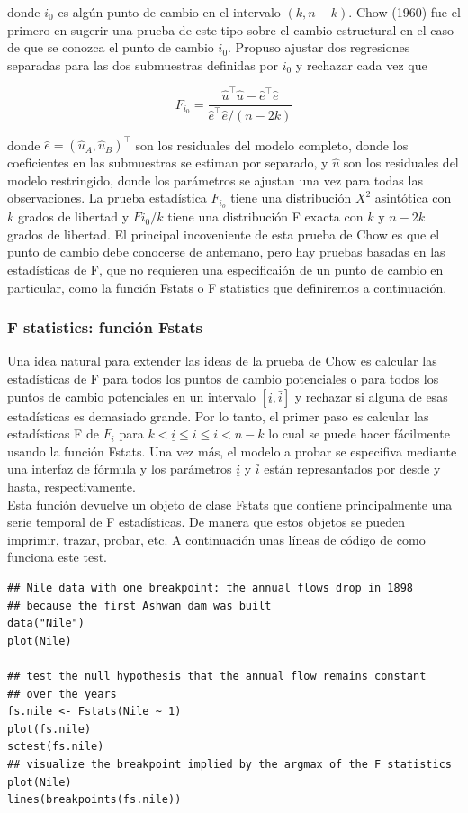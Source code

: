 \documentclass[runningheads,a4paper,12pt]{report}
\begin{document}
donde $i_0$ es algún punto de cambio en el intervalo $(k, n-k)$. Chow (1960) fue el primero en sugerir una prueba de este tipo sobre el cambio estructural en el caso de que se conozca el punto de cambio $i_0$. Propuso ajustar dos regresiones separadas para las dos submuestras definidas por $i_0$ y rechazar cada vez que


\begin{equation}
F_{i_0} = \frac {\hat{u}^\top\hat{u}-\hat{e}^\top\hat{e}}{\hat{e}^\top\hat{e}/(n-2k)}
\end{equation}

donde $\hat{e}=(\hat{u}_A,\hat{u}_B)^\top$ son los residuales del modelo completo, donde los coeficientes en las submuestras se estiman por separado, y $\hat{u}$ son los residuales del modelo restringido, donde los parámetros se ajustan una vez para todas las observaciones. La prueba estadística $F_{i_o}$ tiene una distribución $X^2$ asintótica con $k$ grados de libertad y $F{i_0}/k$ tiene una distribución F exacta con $k$ y $n-2k$ grados de libertad. El principal incoveniente de esta prueba de Chow es que el punto de cambio debe conocerse de antemano, pero hay pruebas basadas en las estadísticas de F, que no requieren una especificaión de un punto de cambio en particular, como la función Fstats o F statistics que definiremos a continuación.

\subsubsection{F statistics: función Fstats}

Una idea natural para extender las ideas de la prueba de Chow es calcular las estadísticas de F para todos los puntos de cambio potenciales o para todos los puntos de cambio potenciales en un intervalo $[\underline{i},\bar{i}]$ y rechazar si alguna de esas estadísticas es demasiado grande. Por lo tanto, el primer paso es calcular las estadísticas F de $F_i$ para $k < \underline{i} \leq i \leq \bar{i} < n - k$ lo cual se puede hacer fácilmente usando la función Fstats. Una vez más, el modelo a probar se especifiva mediante una interfaz de fórmula y los parámetros $\underline{i}$ y $\bar{i}$ están represantados por desde y hasta, respectivamente.\\
Esta función devuelve un objeto de clase Fstats que contiene principalmente una serie temporal de F estadísticas. De manera que estos objetos se pueden imprimir, trazar, probar, etc. A continuación unas líneas de código de como funciona este test.\\
\newpage
\begin{lstlisting}
## Nile data with one breakpoint: the annual flows drop in 1898
## because the first Ashwan dam was built
data("Nile")
plot(Nile)

## test the null hypothesis that the annual flow remains constant
## over the years
fs.nile <- Fstats(Nile ~ 1)
plot(fs.nile)
sctest(fs.nile)
## visualize the breakpoint implied by the argmax of the F statistics
plot(Nile)
lines(breakpoints(fs.nile))
\end{lstlisting}
\end{document}
